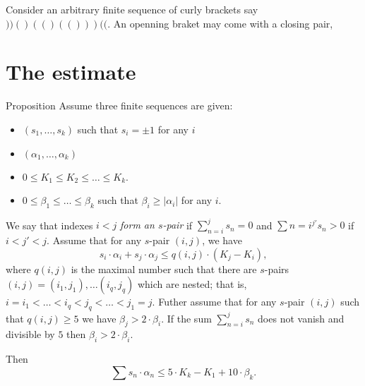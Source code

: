 \documentclass[a4paper,10pt]{amsart}
\begin{document}
Consider an arbitrary finite sequence of curly brackets say $))()(()(()))(($.
An openning braket may come with a closing pair,

\section{The estimate}

\begin{thm}{Proposition}
Assume three finite sequences are given:
\begin{itemize}
\item $(s_1,\dots, s_k)$ such that $s_i=\pm1$ for any $i$
\item $(\alpha_1,\dots,\alpha_k)$
\item $0\le K_1\le K_2\le \dots\le K_k$.
\item $0\le \beta_1\le\dots\le\beta_k$ such that $\beta_i\ge |\alpha_i|$ for any $i$.
\end{itemize}
We say that indexes $i< j$ \emph{form an $s$-pair} if $\sum_{n=i}^js_n=0$ and $\sum{n=i}^{j'}s_n>0$ if $i<j'<j$.
Assume that for any $s$-pair $(i,j)$, we have
\[s_i\cdot\alpha_i+s_j\cdot\alpha_j\le q(i,j)\cdot(K_j-K_i),\]
where $q(i,j)$ is the maximal number such that there are $s$-pairs 
$(i,j)=(i_1,j_1),\dots(i_q,j_q)$ which are nested; that is,
$i=i_1<\dots<i_q<j_q<\dots<j_1=j$.
Futher assume that for any $s$-pair $(i,j)$
such that $q(i,j)\ge 5$ we have $\beta_j>2\cdot \beta_i$.
If the sum $\sum_{n=i}^js_n$ does not vanish and divisible by $5$
then $\beta_i>2\cdot \beta_i$.

Then
\[\sum s_n\cdot \alpha_n\le 5\cdot K_k-K_1+10\cdot \beta_k.\]

\end{thm}
\end{document}

